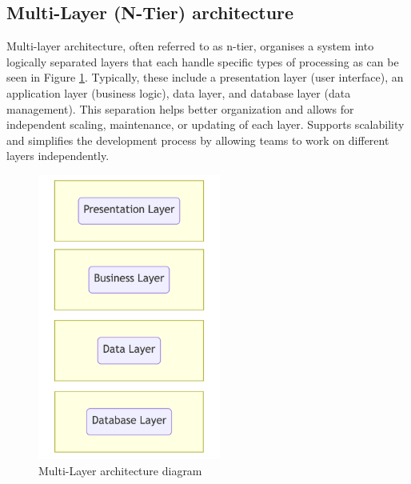 \subsection{Multi-Layer (N-Tier) architecture}
Multi-layer architecture, often referred to as n-tier, organises a system into logically separated layers that each handle specific types of processing as can be seen in Figure \ref{img03:multi_layer_architecture_diagram}. 
Typically, these include a presentation layer (user interface), an application layer (business logic), data layer, and database layer (data management). 
This separation helps better organization and allows for independent scaling, maintenance, or updating of each layer. 
Supports scalability and simplifies the development process by allowing teams to work on different layers independently.
\begin{figure}[H]\centering
\includegraphics[width=60mm]{img/chap03/fig_multi_layer_architecture_mermaid.png}
\caption{Multi-Layer architecture diagram}
\label{img03:multi_layer_architecture_diagram}
\end{figure}








